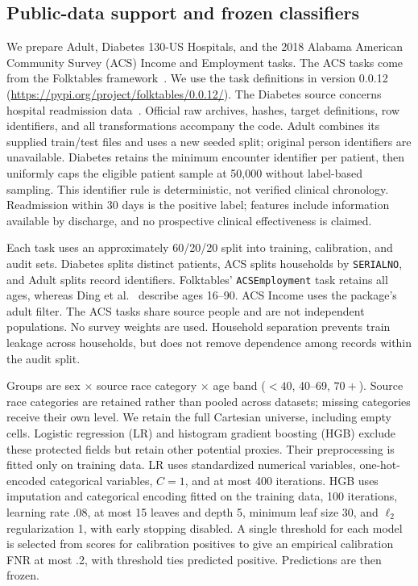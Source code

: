 \documentclass[Afour,sageh,times,doublespace]{sagej}
\begin{document}
\subsection{Public-data support and frozen classifiers}
We prepare Adult, Diabetes 130-US Hospitals, and the 2018 Alabama American Community Survey (ACS) Income and Employment tasks. The ACS tasks come from the Folktables framework~\citep{ding2021retiring}. We use the task definitions in version 0.0.12 (\url{https://pypi.org/project/folktables/0.0.12/}). The Diabetes source concerns hospital readmission data~\citep{strack2014impact}. Official raw archives, hashes, target definitions, row identifiers, and all transformations accompany the code. Adult combines its supplied train/test files and uses a new seeded split; original person identifiers are unavailable. Diabetes retains the minimum encounter identifier per patient, then uniformly caps the eligible patient sample at 50,000 without label-based sampling. This identifier rule is deterministic, not verified clinical chronology. Readmission within 30 days is the positive label; features include information available by discharge, and no prospective clinical effectiveness is claimed.

Each task uses an approximately 60/20/20 split into training, calibration, and audit sets. Diabetes splits distinct patients, ACS splits households by \texttt{SERIALNO}, and Adult splits record identifiers. Folktables' \texttt{ACSEmployment} task retains all ages, whereas Ding et al.~\citep{ding2021retiring} describe ages 16--90. ACS Income uses the package's adult filter. The ACS tasks share source people and are not independent populations. No survey weights are used. Household separation prevents train leakage across households, but does not remove dependence among records within the audit split.

Groups are sex $\times$ source race category $\times$ age band ($<40$, 40--69, $70+$). Source race categories are retained rather than pooled across datasets; missing categories receive their own level. We retain the full Cartesian universe, including empty cells. Logistic regression (LR) and histogram gradient boosting (HGB) exclude these protected fields but retain other potential proxies. Their preprocessing is fitted only on training data. LR uses standardized numerical variables, one-hot-encoded categorical variables, $C=1$, and at most 400 iterations. HGB uses imputation and categorical encoding fitted on the training data, 100 iterations, learning rate .08, at most 15 leaves and depth 5, minimum leaf size 30, and $\ell_2$ regularization 1, with early stopping disabled. A single threshold for each model is selected from scores for calibration positives to give an empirical calibration FNR at most .2, with threshold ties predicted positive. Predictions are then frozen.
\end{document}
